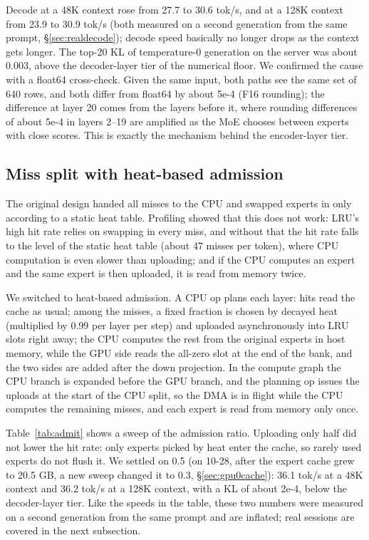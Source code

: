\documentclass[11pt,a4paper]{article}
\newcommand{\tps}{tok/s}
\begin{document}
Decode at a 48K context rose from 27.7 to 30.6 \tps{}, and at a 128K context from 23.9 to 30.9 \tps{} (both measured on a second generation from the same prompt, \S\ref{sec:realdecode}); decode speed basically no longer drops as the context gets longer. The top-20 KL of temperature-0 generation on the server was about 0.003, above the decoder-layer tier of the numerical floor. We confirmed the cause with a float64 cross-check. Given the same input, both paths see the same set of 640 rows, and both differ from float64 by about 5e-4 (F16 rounding); the difference at layer 20 comes from the layers before it, where rounding differences of about 5e-4 in layers 2--19 are amplified as the MoE chooses between experts with close scores. This is exactly the mechanism behind the encoder-layer tier.

\subsection{Miss split with heat-based admission}

The original design handed all misses to the CPU and swapped experts in only according to a static heat table. Profiling showed that this does not work: LRU's high hit rate relies on swapping in every miss, and without that the hit rate falls to the level of the static heat table (about 47 misses per token), where CPU computation is even slower than uploading; and if the CPU computes an expert and the same expert is then uploaded, it is read from memory twice.

We switched to heat-based admission. A CPU op plans each layer: hits read the cache as usual; among the misses, a fixed fraction is chosen by decayed heat (multiplied by 0.99 per layer per step) and uploaded asynchronously into LRU slots right away; the CPU computes the rest from the original experts in host memory, while the GPU side reads the all-zero slot at the end of the bank, and the two sides are added after the down projection. In the compute graph the CPU branch is expanded before the GPU branch, and the planning op issues the uploads at the start of the CPU split, so the DMA is in flight while the CPU computes the remaining misses, and each expert is read from memory only once.

Table~\ref{tab:admit} shows a sweep of the admission ratio. Uploading only half did not lower the hit rate: only experts picked by heat enter the cache, so rarely used experts do not flush it. We settled on 0.5 (on 10-28, after the expert cache grew to 20.5 GB, a new sweep changed it to 0.3, \S\ref{sec:gpu0cache}): 36.1 \tps{} at a 48K context and 36.2 \tps{} at a 128K context, with a KL of about 2e-4, below the decoder-layer tier. Like the speeds in the table, these two numbers were measured on a second generation from the same prompt and are inflated; real sessions are covered in the next subsection.
\end{document}
